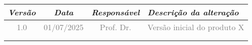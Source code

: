 
\begin{table}[H]
	\centering
	\begin{tabularx}{\textwidth}{|c|c|c|X|}
		\hline
		\textcolor{airdataBlue}{\textit{Versão}} &
		\textcolor{airdataBlue}{\textit{Data}} &
		\textcolor{airdataBlue}{\textit{Responsável}} &
		\textcolor{airdataBlue}{\textit{Descrição da alteração}} \\
		\hline
		\textcolor{gray}{1.0} & \textcolor{gray}{01/07/2025} & \textcolor{gray}{Prof. Dr.} & \textcolor{gray}{Versão inicial do produto X} \\
		\hline
		& & & \\
		\hline
		& & & \\
		\hline
	\end{tabularx}
\end{table}
